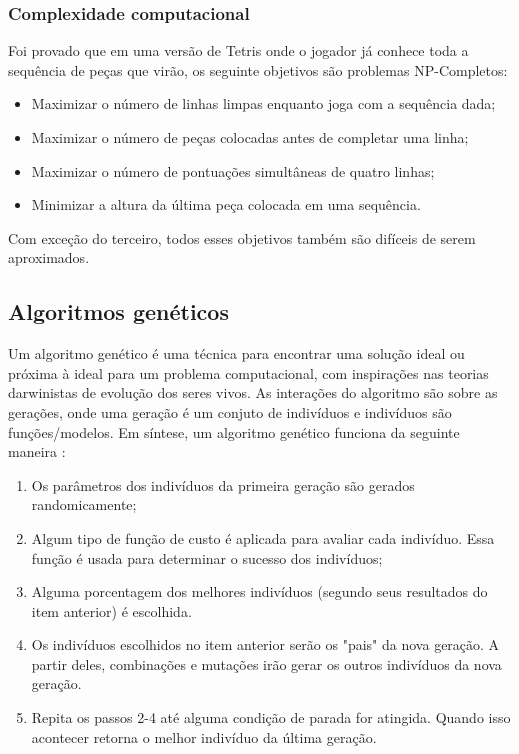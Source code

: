 \documentclass[conference]{IEEEtran}
\begin{document}
\subsubsection{Complexidade computacional}
Foi provado \cite{b2} que em uma versão de Tetris onde o jogador já conhece toda a sequência de peças que virão, os seguinte objetivos são problemas NP-Completos:
\begin{itemize}
\item Maximizar o número de linhas limpas enquanto joga com a sequência dada;

\item Maximizar o número de peças colocadas antes de completar uma linha;

\item Maximizar o número de pontuações simultâneas de quatro linhas;

\item Minimizar a altura da última peça colocada em uma sequência.

\end{itemize}

Com exceção do terceiro, todos esses objetivos também são difíceis de serem aproximados. 

\subsection{Algoritmos genéticos}
Um algoritmo genético é uma técnica para encontrar uma solução ideal ou próxima à ideal para um problema computacional, com inspirações nas teorias darwinistas de evolução dos seres vivos. As interações do algoritmo são sobre as gerações, onde uma geração é um conjuto de indivíduos e indivíduos são funções/modelos. Em síntese, um algoritmo genético funciona da seguinte maneira \cite{b3}:

\begin{enumerate}
\item Os parâmetros dos indivíduos da primeira geração são gerados randomicamente;

\item Algum tipo de função de custo é aplicada para avaliar cada indivíduo. Essa função é usada para determinar o sucesso dos indivíduos;

\item Alguma porcentagem dos melhores indivíduos (segundo seus resultados do item anterior) é escolhida.

\item Os indivíduos escolhidos no item anterior serão os "pais" da nova geração. A partir deles, combinações e mutações irão gerar os outros indivíduos da nova geração.

\item Repita os passos 2-4 até alguma condição de parada for atingida. Quando isso acontecer retorna o melhor indivíduo da última geração.

\end{enumerate}
\end{document}
